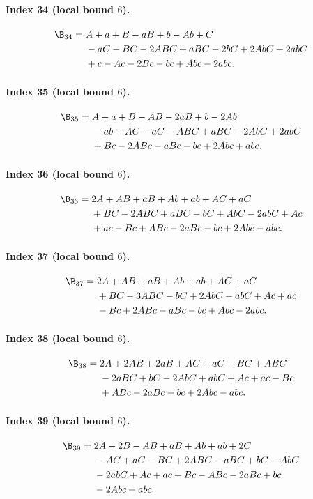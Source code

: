 \paragraph{Index 34 (local bound $6$).}
\begin{align*}
\B_{34}={}&A +a +B -aB +b -Ab +C\\
&{}-aC -BC -2ABC +aBC -2bC +2AbC +2abC\\
&{}+c -Ac -2Bc -bc +Abc -2abc.
\end{align*}
\paragraph{Index 35 (local bound $6$).}
\begin{align*}
\B_{35}={}&A +a +B -AB -2aB +b -2Ab\\
&{}-ab +AC -aC -ABC +aBC -2AbC +2abC\\
&{}+Bc -2ABc -aBc -bc +2Abc +abc.
\end{align*}
\paragraph{Index 36 (local bound $6$).}
\begin{align*}
\B_{36}={}&2A +AB +aB +Ab +ab +AC +aC\\
&{}+BC -2ABC +aBC -bC +AbC -2abC +Ac\\
&{}+ac -Bc +ABc -2aBc -bc +2Abc -abc.
\end{align*}
\paragraph{Index 37 (local bound $6$).}
\begin{align*}
\B_{37}={}&2A +AB +aB +Ab +ab +AC +aC\\
&{}+BC -3ABC -bC +2AbC -abC +Ac +ac\\
&{}-Bc +2ABc -aBc -bc +Abc -2abc.
\end{align*}
\paragraph{Index 38 (local bound $6$).}
\begin{align*}
\B_{38}={}&2A +2AB +2aB +AC +aC -BC +ABC\\
&{}-2aBC +bC -2AbC +abC +Ac +ac -Bc\\
&{}+ABc -2aBc -bc +2Abc -abc.
\end{align*}
\paragraph{Index 39 (local bound $6$).}
\begin{align*}
\B_{39}={}&2A +2B -AB +aB +Ab +ab +2C\\
&{}-AC +aC -BC +2ABC -aBC +bC -AbC\\
&{}-2abC +Ac +ac +Bc -ABc -2aBc +bc\\
&{}-2Abc +abc.
\end{align*}

